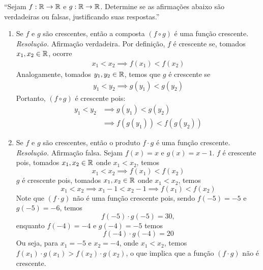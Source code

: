 \enquote{Sejam $f: \mathbb R \rightarrow \mathbb R$ e $g: \mathbb R \rightarrow \mathbb R$. Determine se as afirmações abaixo são verdadeiras ou falsas, justificando suas respostas.}
\begin{enumerate}
    \item Se $f$ e $g$ são crescentes, então a composta $(f \circ g)$ é uma função crescente. \\
    \emph{Resolução.} Afirmação verdadeira. Por definição, $f$ é crescente se, tomados $x_1, x_2 \in \mathbb R$, ocorre
    \begin{align*}
        x_1 < x_2 \implies f(x_1) < f(x_2)
    \end{align*}
    Analogamente, tomados $y_1, y_2 \in \mathbb R$, temos que $g$ é crescente se
    \begin{align*}
        y_1 < y_2 \implies g(y_1) < g(y_2)
    \end{align*}
    Portanto, $(f \circ g)$ é crescente pois:
    \begin{align*}
        y_1 < y_2 & \implies g(y_1) < g(y_2) \\ & \implies
        f(g(y_1)) < f(g(y_2))
    \end{align*}
    \item Se $f$ e $g$ são crescentes, então o produto $f \cdot g$ é uma função crescente. \\
    \emph{Resolução.} Afirmação falsa. Sejam $f(x) = x$ e $g(x) = x - 1$. $f$ é crescente pois, tomados $x_1, x_2 \in \mathbb R$ onde $x_1 < x_2$, temos
    \begin{displaymath}
        x_1 < x_2 \implies f(x_1) < f(x_2)
    \end{displaymath}
    $g$ é crescente pois, tomados $x_1, x_2 \in \mathbb R$ onde $x_1 < x_2$, temos
    \begin{displaymath}
        x_1 < x_2 \implies x_1 - 1 < x_2 - 1 \implies f(x_1) < f(x_2) 
    \end{displaymath}
    Note que $(f \cdot g)$ não é uma função crescente pois, sendo $f(-5) = -5$ e $g(-5) = -6$, temos
    \begin{displaymath}
        f(-5) \cdot g(-5) = 30,
    \end{displaymath}
    enquanto $f(-4) = -4$ e $g(-4) = -5$ temos
    \begin{displaymath}
        f(-4) \cdot g(-4) = 20 
    \end{displaymath}
    Ou seja, para $x_1 = -5$ e $x_2 = -4$, onde $x_1 < x_2$, temos $f(x_1) \cdot g(x_1) > f(x_2) \cdot g(x_2)$, o que implica que a função $(f \cdot g)$ não é crescente.
\end{enumerate}
